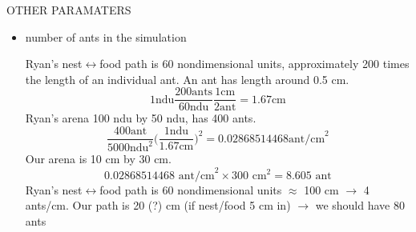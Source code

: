 \documentclass{article}
\theoremstyle{definition}
\begin{document}
OTHER PARAMATERS
\begin{itemize}
	\item number of ants in the simulation
    
    Ryan's nest$\leftrightarrow$food path is 60 nondimensional units, approximately 200 times the length of an individual ant. An ant has length around 0.5 cm.
    \[
    1 \text{ndu} \frac{200 \text{ants}}{60 \text{ndu}} \frac{1 \text{cm}}{2 \text{ant}} = 1.67 \text{cm}
    \]
    Ryan's arena 100 ndu by 50 ndu, has 400 ants.
    \[
    \frac{400 \text{ant}}{5000 \text{ndu}^2} \Big(\frac{1 \text{ndu}}{1.67\text{cm}}\Big)^2 = 0.02868514468 \text{ant/cm}^2
    \] 
    Our arena is 10 cm by 30 cm.
    \[
    0.02868514468 \text{ ant/cm}^2 \times 300 \text{ cm}^2 = 8.605 \text{ ant}
    \]
    Ryan's nest$\leftrightarrow$food path is 60 nondimensional units $\approx$ 100 cm $\rightarrow$ 4 ants/cm. Our path is 20 (?) cm (if nest/food 5 cm in) $\rightarrow$ we should have 80 ants
\end{itemize}

\nocite{*} %


\end{document}
